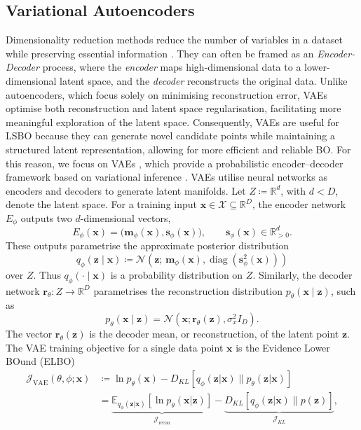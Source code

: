 \documentclass[pdflatex,sn-mathphys-num]{sn-jnl}%
\theoremstyle{thmstyleone}%
\theoremstyle{thmstyletwo}%
\theoremstyle{thmstylethree}%
\begin{document}
\subsection{Variational Autoencoders}\label{subsection VAE}
Dimensionality reduction methods reduce the number of variables in a dataset while preserving essential information \cite{Velliangiri2019}. They can often be framed as an \textit{Encoder-Decoder} process, where the \textit{encoder} maps high-dimensional data to a lower-dimensional latent space, and the \textit{decoder} reconstructs the original data. Unlike autoencoders, which focus solely on minimising reconstruction error, VAEs optimise both reconstruction and latent space regularisation, facilitating more meaningful exploration of the latent space. Consequently, VAEs are useful for LSBO because they can generate novel candidate points while maintaining a structured latent representation, allowing for more efficient and reliable BO. For this reason, we focus on VAEs \cite{kingma2022autoencodingvariationalbayes, doersch2021tutorialvariationalautoencoders}, which provide a probabilistic encoder–decoder framework based on variational inference \cite{Hinton1993, Jordan1998}. VAEs utilise neural networks as encoders and decoders to generate latent manifolds. Let \(Z \coloneq \mathbb R^d\), with \(d < D\), denote the latent space. For a training input \(\mathbf x\in\mathcal X\subseteq\mathbb R^D\), the encoder network \(E_\phi\) outputs two \(d\)-dimensional vectors,
\[
    E_\phi(\mathbf x)
    =
    \bigl(\mathbf m_\phi(\mathbf x),\mathbf s_\phi(\mathbf x)\bigr),
    \qquad \mathbf s_\phi(\mathbf x)\in\mathbb R^d_{>0}.
\]
These outputs parametrise the approximate posterior distribution
\[
    q_\phi(\mathbf z\mid \mathbf x)
    \coloneq
    \mathcal N\!\left(
        \mathbf z;\,
        \mathbf m_\phi(\mathbf x),
        \operatorname{diag}(\mathbf s_\phi^2(\mathbf x))
    \right)
\]
over \(Z\). Thus \(q_\phi(\cdot\mid\mathbf x)\) is a probability distribution on \(Z\). Similarly, the decoder network \(\mathbf r_\theta:Z\to\mathbb R^D\) parametrises the reconstruction distribution \(p_\theta(\mathbf x\mid\mathbf z)\), such as 
\[
    p_\theta(\mathbf x\mid\mathbf z)
    =
    \mathcal N\!\left(
        \mathbf x;\mathbf r_\theta(\mathbf z),\sigma_x^2 I_D
    \right).
\]
The vector \(\mathbf r_\theta(\mathbf z)\) is the decoder mean, or reconstruction, of the latent point \(\mathbf z\). The VAE training objective for a single data point \(\mathbf x\) is the Evidence Lower BOund (ELBO)
%
\begin{equation}\label{VAE ELBO raw single point}
    \begin{split}
       \mathcal{J}_{\mathrm{VAE}}(\theta, \phi; \mathbf{x}) & \coloneq \ln p_{\theta}(\mathbf{x}) - D_{KL} [q_{\phi}(\mathbf{z|x}) \| p_{\theta}(\mathbf{z|x})] \\
       & = \underbrace{\mathbb{E}_{q_{\phi}(\mathbf{z|x})} [\ln p_{\theta}(\mathbf{x|z})]}_{\mathcal{J}_{\mathrm{recon}}} - \underbrace{D_{KL} [q_{\phi}(\mathbf{z|x}) \| p(\mathbf{z})]}_{\mathcal{J}_{KL}},
    \end{split}
\end{equation}
\end{document}
